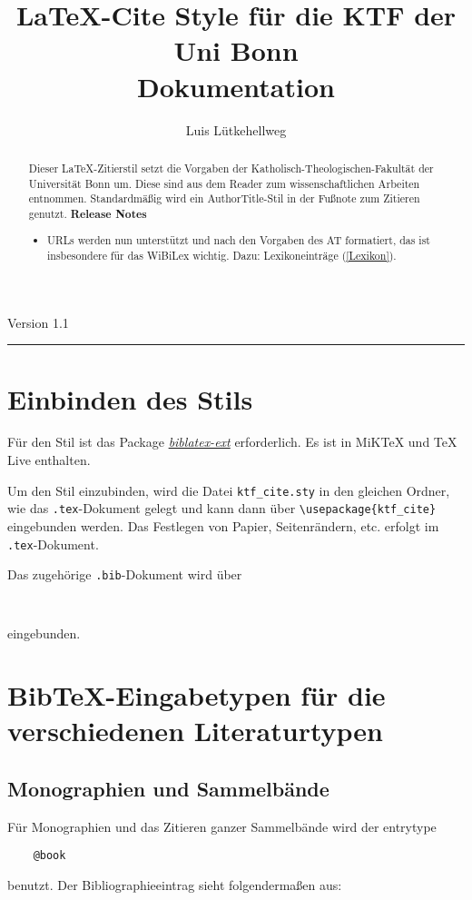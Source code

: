 \documentclass[12pt]{article}
\title{\LaTeX-Cite Style für die KTF der Uni Bonn \\ Dokumentation}
\author{Luis Lütkehellweg}
\begin{document}
\maketitle
\begin{center}
	\large{Version 1.1}
\end{center}


\bigskip

\begin{abstract}
Dieser \LaTeX-Zitierstil setzt die Vorgaben der Katholisch-Theologischen-Fakultät der Universität Bonn um. Diese sind aus dem Reader zum wissenschaftlichen Arbeiten entnommen. Standardmäßig wird ein AuthorTitle-Stil in der Fußnote zum Zitieren genutzt. \bigbreak
\textbf{Release Notes}
\begin{itemize}
	\item URLs werden nun unterstützt und nach den Vorgaben des AT formatiert, das ist insbesondere für das WiBiLex wichtig. Dazu: Lexikoneinträge (\ref{Lexikon}).
\end{itemize}
\end{abstract}
\bigskip
\hrule
\bigskip
\section{Einbinden des Stils}
Für den Stil ist das Package \href{https://github.com/moewew/biblatex-ext}{\textit{biblatex-ext}} erforderlich. Es ist in MiKTeX und TeX Live enthalten.

Um den Stil einzubinden, wird die Datei \verb#ktf_cite.sty# in den gleichen Ordner, wie das \verb#.tex#-Dokument gelegt und kann dann über \verb#\usepackage{ktf_cite}# eingebunden werden. Das Festlegen von Papier, Seitenrändern, etc. erfolgt im \verb#.tex#-Dokument.

Das zugehörige \verb_.bib_-Dokument wird über 
\begin{verbatim}
	
\end{verbatim}
eingebunden.

\section{BibTeX-Eingabetypen für die verschiedenen Literaturtypen}
\subsection*{Monographien und Sammelbände}
Für Monographien und das Zitieren ganzer Sammelbände wird der entrytype \nocite{*}
\begin{verbatim}
	@book
\end{verbatim}
benutzt. Der Bibliographieeintrag sieht folgendermaßen aus:
\printbibliography[type=book, title={}]
\end{document}
